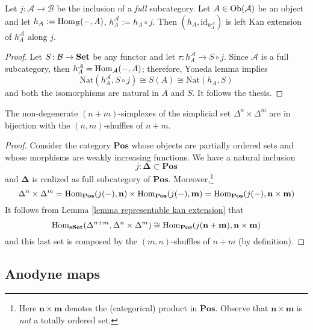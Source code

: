 \begin{lemma} \label{lemma representable kan extension}
Let $j \colon \mathcal A \to \mathcal B$ be the inclusion of a \emph{full} subcategory. Let $A \in \mathrm{Ob}(\mathcal A)$ be an object and let $h_A := \mathrm{Hom}_{\mathcal B}(-,A)$, $h_A^{\mathcal A} := h_A \circ j$. Then $(h_A, \mathrm{id}_{h_A^{\mathcal A}})$ is left Kan extension of $h_A^{\mathcal A}$ along $j$.
\end{lemma}

\begin{proof}
Let $S \colon \mathcal B \to \mathbf{Set}$ be any functor and let $\tau \colon h_A^{\mathcal A} \to S \circ j$. Since $\mathcal A$ is a full subcategory, then $h_A^{\mathcal A} = \mathrm{Hom}_{\mathcal A}(-,A)$; therefore, Yoneda lemma implies
\[
\mathrm{Nat}(h_A^{\mathcal A}, S \circ j) \cong S(A) \cong \mathrm{Nat}(h_A, S)
\]
and both the isomorphisms are natural in $A$ and $S$. It follows the thesis.
\end{proof}

\begin{cor}
The non-degenerate $(n+m)$-simplexes of the simplicial set $\Delta^n \times \Delta^m$ are in bijection with the $(n,m)$-shuffles of $n+m$.
\end{cor}

\begin{proof}
Consider the category $\mathbf{Pos}$ whose objects are partially ordered sets and whose morphisms are weakly increasing functions. We have a natural inclusion
\[
j \colon \mathbf \Delta \subset \mathbf{Pos}
\]
and $\mathbf \Delta$ is realized as full subcategory of $\mathbf{Pos}$. Moreover,\footnote{Here $\mathbf n \times \mathbf m$ denotes the (categorical) product in $\mathbf{Pos}$. Observe that $\mathbf n \times \mathbf m$ is \emph{not} a totally ordered set.}
\[
\Delta^n \times \Delta^m = \mathrm{Hom}_{\mathbf{Pos}}(j(-), \mathbf n) \times \mathrm{Hom}_{\mathbf{Pos}}(j(-),\mathbf m) = \mathrm{Hom}_{\mathbf{Pos}}(j(-),\mathbf n \times \mathbf m)
\]
It follows from Lemma \ref{lemma representable kan extension} that
\[
\mathrm{Hom}_{\mathbf{sSet}}(\Delta^{n+m}, \Delta^n \times \Delta^m) \cong \mathrm{Hom}_{\mathbf{Pos}}(j(\mathbf{n + m}), \mathbf n \times \mathbf m)
\]
and this last set is composed by the $(m,n)$-shuffles of $n+m$ (by definition).
\end{proof}

\subsection{Anodyne maps}

